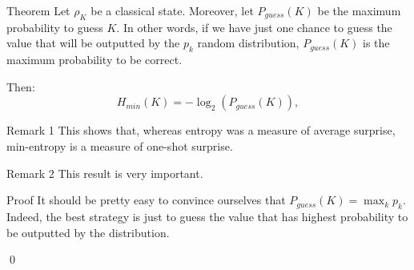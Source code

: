 \documentclass[a4paper]{article}
\begin{document}
\begin{parag}{Theorem}
    Let $\rho_K$ be a classical state. Moreover, let $P_{guess}\left(K\right)$ be the maximum probability to guess $K$. In other words, if we have just one chance to guess the value that will be outputted by the $p_k$ random distribution, $P_{guess}\left(K\right)$ is the maximum probability to be correct.

    Then:
    \[H_{min}\left(K\right) = -\log_2\left(P_{guess}\left(K\right)\right),\]

    \begin{subparag}{Remark 1}
        This shows that, whereas entropy was a measure of average surprise, min-entropy is a measure of one-shot surprise.
    \end{subparag}

    \begin{subparag}{Remark 2}
        This result is very important.
    \end{subparag}

    \begin{subparag}{Proof}
        It should be pretty easy to convince ourselves that $P_{guess}\left(K\right) = \max_k p_k$. Indeed, the best strategy is just to guess the value that has highest probability to be outputted by the distribution.

        \qed
    \end{subparag}
\end{parag}
\end{document}
